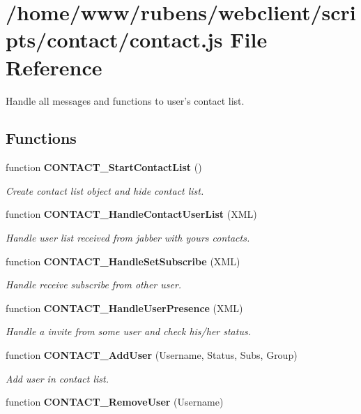 \section{/home/www/rubens/webclient/scripts/contact/contact.js File Reference}
\label{contact_2contact_8js}
Handle all messages and functions to user's contact list. 

\subsection*{Functions}
\begin{CompactItemize}
\item 
function {\bf CONTACT\_\-StartContactList} ()
\begin{CompactList}\small\item\em Create contact list object and hide contact list. \item\end{CompactList}\item 
function {\bf CONTACT\_\-HandleContactUserList} (XML)
\begin{CompactList}\small\item\em Handle user list received from jabber with yours contacts. \item\end{CompactList}\item 
function {\bf CONTACT\_\-HandleSetSubscribe} (XML)
\begin{CompactList}\small\item\em Handle receive subscribe from other user. \item\end{CompactList}\item 
function {\bf CONTACT\_\-HandleUserPresence} (XML)
\begin{CompactList}\small\item\em Handle a invite from some user and check his/her status. \item\end{CompactList}\item 
function {\bf CONTACT\_\-AddUser} (Username, Status, Subs, Group)
\begin{CompactList}\small\item\em Add user in contact list. \item\end{CompactList}\item 
function {\bf CONTACT\_\-RemoveUser} (Username)

\end{CompactItemize}
